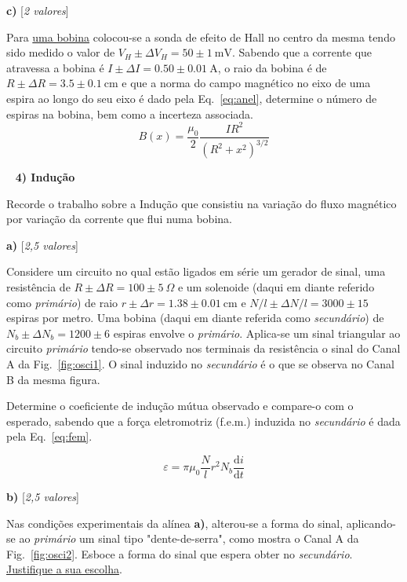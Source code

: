 \documentclass[11pt,a4paper,final]{article}
\begin{document}
\textbf{c)} \hfill [\textit{2 valores}]

Para \underline{uma bobina} colocou-se a sonda de efeito de Hall no centro da mesma tendo sido medido o valor de $V_H\pm\Delta V_H=50\pm1~\text{mV}$. Sabendo que a corrente que atravessa a bobina é $I\pm\Delta I=0.50\pm0.01~\text{A}$, o raio da bobina é de $R\pm\Delta R=3.5	\pm0.1~\text{cm}$ e que a norma do campo magn\'{e}tico no eixo de uma espira ao longo do seu eixo \'{e} dado pela Eq.~\ref{eq:anel}, determine o n\'{u}mero de espiras na bobina, bem como a incerteza associada.
\begin{equation}
\label{eq:anel}
B\left(x\right)=\frac{\mu_0}{2}\frac{IR^2}{\left(R^2+x^2\right)^{3/2}}
\end{equation}

~\linebreak
\noindent\textbf{4) Indu\c{c}\~{a}o} %

Recorde o trabalho sobre a Indu\c{c}\~{a}o que consistiu na varia\c{c}\~{a}o do fluxo magn\'{e}tico por varia\c{c}\~{a}o da corrente que flui numa bobina.

\textbf{a)} \hfill [\textit{2,5 valores}]

Considere um circuito no qual est\~{a}o ligados em s\'{e}rie um gerador de sinal, uma resist\^{e}ncia de $R\pm\Delta R=100\pm5~\Omega$ e um solenoide (daqui em diante referido como \emph{prim\'{a}rio}) de raio $r\pm\Delta r=1.38\pm0.01~\text{cm}$ e $N/l\pm\Delta N/l=3000\pm15$ espiras por metro. Uma bobina (daqui em diante referida como \emph{secund\'{a}rio}) de $N_b\pm\Delta N_b=1200\pm6$ espiras envolve o \emph{prim\'{a}rio}. Aplica-se um sinal triangular ao circuito \emph{prim\'{a}rio} tendo-se observado nos terminais da resist\^{e}ncia o sinal do Canal A da Fig.~\ref{fig:osci1}. O sinal induzido no \emph{secund\'{a}rio} é o que se observa no Canal B da mesma figura.

Determine o coeficiente de indu\c{c}\~{a}o m\'{u}tua observado e compare-o com o esperado, sabendo que a for\c{c}a eletromotriz (f.e.m.) induzida no \emph{secund\'{a}rio} é dada pela Eq.~\ref{eq:fem}.

\begin{equation}
\label{eq:fem}
\varepsilon=\pi\mu_0\frac{N}{l}r^2N_b\frac{\mathrm d i}{\mathrm d t}
\end{equation}

\textbf{b)} \hfill [\textit{2,5 valores}]

Nas condi\c{c}\~{o}es experimentais da al\'{i}nea \textbf{a)}, alterou-se a forma do sinal, aplicando-se ao \emph{prim\'{a}rio} um sinal tipo "dente-de-serra", como mostra o Canal A da Fig.~\ref{fig:osci2}. Esboce a forma do sinal que espera obter no \emph{secund\'{a}rio}. \underline{Justifique a sua escolha}.
\end{document}
